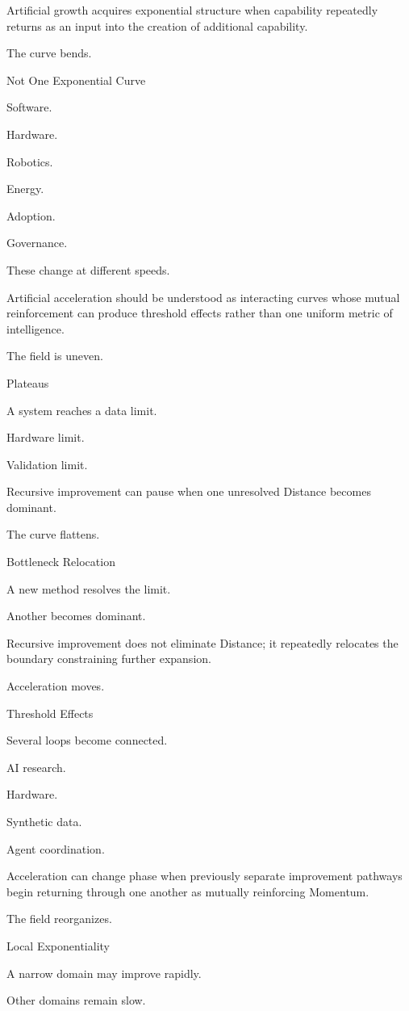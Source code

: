 Artificial growth acquires exponential structure when capability repeatedly returns as an input into the creation of additional capability.

The curve bends.

Not One Exponential Curve

Software.

Hardware.

Robotics.

Energy.

Adoption.

Governance.

These change at different speeds.

Artificial acceleration should be understood as interacting curves whose mutual reinforcement can produce threshold effects rather than one uniform metric of intelligence.

The field is uneven.

Plateaus

A system reaches a data limit.

Hardware limit.

Validation limit.

Recursive improvement can pause when one unresolved Distance becomes dominant.

The curve flattens.

Bottleneck Relocation

A new method resolves the limit.

Another becomes dominant.

Recursive improvement does not eliminate Distance; it repeatedly relocates the boundary constraining further expansion.

Acceleration moves.

Threshold Effects

Several loops become connected.

AI research.

Hardware.

Synthetic data.

Agent coordination.

Acceleration can change phase when previously separate improvement pathways begin returning through one another as mutually reinforcing Momentum.

The field reorganizes.

Local Exponentiality

A narrow domain may improve rapidly.

Other domains remain slow.

